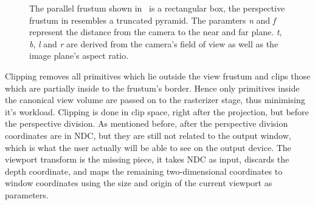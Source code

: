 \begin{figure}
\centering
{}
\caption[Parallel and Perspective Frustum]{The parallel frustum shown
in~ is a rectangular box, the perspective 
frustum in  resembles a truncated
pyramid. The paramters \textit{n} and \textit{f} represent the distance from the
camera to the near and far plane. \textit{t}, \textit{b}, \textit{l} and
\textit{r} are derived from the camera's field of view as well as the image
plane's aspect ratio.}
\label{fig:parallelandperspectivefrustum}
\end{figure}

Clipping removes all primitives which lie outside the view frustum and clips
those which are partially inside to the frustum's border. Hence only
primitives inside the canonical view volume are passed on to the rasterizer
stage, thus minimising it's workload. Clipping is done in clip space, right
after the projection, but before the perspective division. As mentioned before,
after the perspective division coordinates are in NDC, but they are still not
related to the output window, which is what the user actually will be able to
see on the output device. The viewport transform is the missing piece, it takes
NDC as input, discards the depth coordinate, and maps the remaining
two-dimensional coordinates to window coordinates using the size and origin of
the current viewport as parameters.

